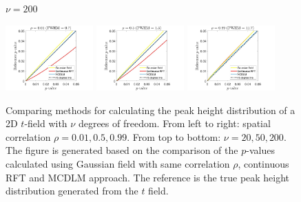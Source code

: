 \documentclass{article}
\begin{document}
\begin{figure}[!htp]
\begin{sideways}
\phantom{------------------}$\nu = 200$
\end{sideways}
\includegraphics[trim=70 5 100 5, clip,width=0.3\textwidth]{figure/2D_nu200_rho0.01.jpg}
\includegraphics[trim=70 5 100 5, clip,width=0.3\textwidth]{figure/2D_nu200_rho0.5.jpg}
\includegraphics[trim=70 5 100 5, clip,width=0.3\textwidth]{figure/2D_nu200_rho0.99.jpg}
\caption{Comparing methods for calculating the peak height distribution of a 2D $t$-field with $\nu$ degrees of freedom. From left to right: spatial correlation $\rho = 0.01, 0.5, 0.99$. From top to bottom: $\nu = 20, 50, 200$. The figure is generated based on the comparison of the $p$-values calculated using Gaussian field with same correlation $\rho$, continuous RFT and MCDLM approach. The reference is the true peak height distribution generated from the $t$ field.\label{fig11}}
\end{figure}
\end{document}
